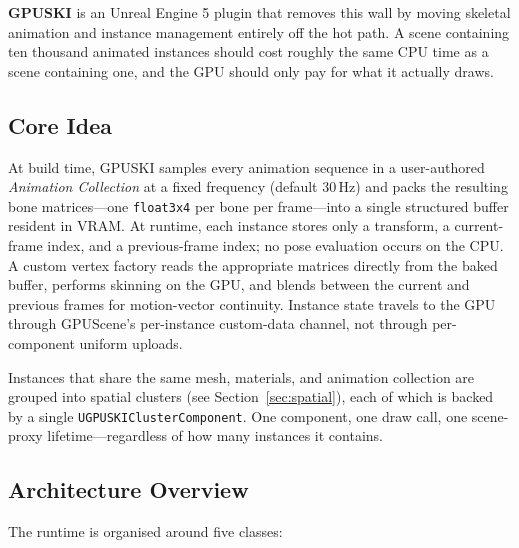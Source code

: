\documentclass[11pt, a4paper]{article}
\begin{document}
\textbf{GPUSKI} is an Unreal Engine 5 plugin that removes this wall by moving skeletal animation and instance management entirely off the hot path. A scene containing ten thousand animated instances should cost roughly the same CPU time as a scene containing one, and the GPU should only pay for what it actually draws.

\subsection{Core Idea}

At build time, GPUSKI samples every animation sequence in a user-authored \emph{Animation Collection} at a fixed frequency (default 30\,Hz) and packs the resulting bone matrices---one \texttt{float3x4} per bone per frame---into a single structured buffer resident in VRAM. At runtime, each instance stores only a transform, a current-frame index, and a previous-frame index; no pose evaluation occurs on the CPU. A custom vertex factory reads the appropriate matrices directly from the baked buffer, performs skinning on the GPU, and blends between the current and previous frames for motion-vector continuity. Instance state travels to the GPU through GPUScene's per-instance custom-data channel, not through per-component uniform uploads.

Instances that share the same mesh, materials, and animation collection are grouped into spatial clusters (see Section~\ref{sec:spatial}), each of which is backed by a single \texttt{UGPUSKIClusterComponent}. One component, one draw call, one scene-proxy lifetime---regardless of how many instances it contains.

\subsection{Architecture Overview}

The runtime is organised around five classes:
\end{document}
